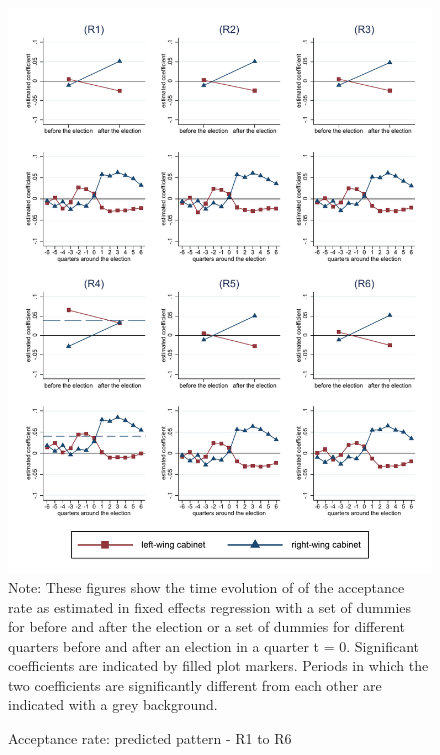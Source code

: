 \documentclass[11pt,a4paper]{scrartcl}
\begin{document}
\clearpage
\FloatBarrier
\begin{figure}[!ht]
	\caption{Acceptance rate: predicted pattern - R1 to R6}
	\includegraphics[width=1\textwidth]{../results/decisions/acceptance_rate_graphs_R1-R6.pdf}
	\scriptsize{Note: These figures show the time evolution of of the acceptance rate as estimated in fixed effects regression with a set of dummies for before and after the election or a set of dummies for different quarters before and after an election in a quarter t = 0. Significant coefficients are indicated by filled plot markers. Periods in which the two coefficients are significantly different from each other are indicated with a grey background.}
\end{figure}

\clearpage
\FloatBarrier



\clearpage
\FloatBarrier


\end{document}
